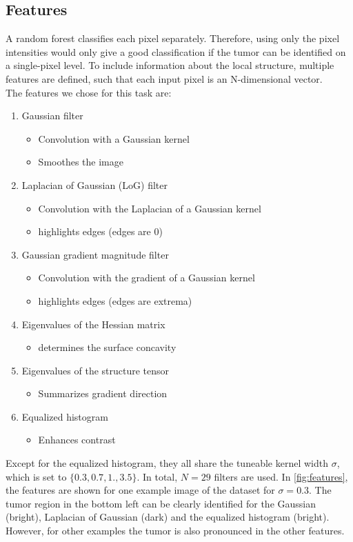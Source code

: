 \documentclass[final]{article}
\begin{document}
\subsection{Features}
A random forest classifies each pixel separately. Therefore, using only the
pixel intensities would only give a good classification if the tumor can be
identified on a single-pixel level. To include information about the local
structure, multiple features are defined, such that each input pixel is an
N-dimensional vector.\\ The features we chose for this task are:
\begin{enumerate}
\item Gaussian filter
\begin{itemize}
\item Convolution with a Gaussian kernel
\item Smoothes the image
\end{itemize}
\item Laplacian of Gaussian (LoG) filter
\begin{itemize}
\item Convolution with the Laplacian of a Gaussian kernel
\item highlights edges (edges are 0)
\end{itemize}
\item Gaussian gradient magnitude filter
\begin{itemize}
\item Convolution with the gradient of a Gaussian kernel
\item highlights edges (edges are extrema)
\end{itemize}
\item Eigenvalues of the Hessian matrix
\begin{itemize}
\item determines the surface concavity
\end{itemize}
\item Eigenvalues of the structure tensor
\begin{itemize}
\item Summarizes gradient direction
\end{itemize}
\item Equalized histogram
\begin{itemize}
\item Enhances contrast
\end{itemize}
\end{enumerate}

Except for the equalized histogram, they all share the tuneable kernel width
$\sigma$, which is set to $\{0.3, 0.7, 1., 3.5\}$. In total, $N=29$ filters are
used. In \cref{fig:features}, the features are shown for one example image of
the dataset for $\sigma = 0.3$. The tumor region in the bottom left can be
clearly identified for the Gaussian (bright), Laplacian of Gaussian (dark) and
the equalized histogram (bright). However, for other examples the tumor is also
pronounced in the other features.
\end{document}
